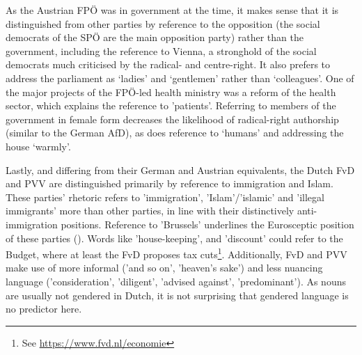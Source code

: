 \documentclass{article}
\begin{document}

As the Austrian FPÖ was in government at the time, it makes sense that it is distinguished from other parties by reference to the opposition (the social democrats of the SPÖ are the main opposition party) rather than the government, including the reference to Vienna, a stronghold of the social democrats much criticised by the radical- and centre-right. It also prefers to address the parliament as ‘ladies’ and ‘gentlemen’ rather than ‘colleagues’. One of the major projects of the FPÖ-led health ministry was a reform of the health sector, which explains the reference to 'patients'. Referring to members of the government in female form decreases the likelihood of radical-right authorship (similar to the German AfD), as does reference to ‘humans’ and addressing the house ‘warmly’.\par

Lastly, and differing from their German and Austrian equivalents, the Dutch FvD and PVV are distinguished primarily by reference to immigration and Islam. These parties' rhetoric refers to 'immigration', 'Islam'/'islamic' and 'illegal immigrants' more than other parties, in line with their distinctively anti-immigration positions. Reference to 'Brussels' underlines the Eurosceptic position of these parties (\cite{ThePopulist2019}). Words like 'house-keeping', and 'discount' could refer to the Budget, where at least the FvD proposes tax cuts\footnote{See \url{https://www.fvd.nl/economie}}. Additionally, FvD and PVV make use of more informal ('and so on', 'heaven’s sake') and less nuancing language ('consideration', 'diligent', 'advised against', 'predominant'). As nouns are usually not gendered in Dutch, it is not surprising that gendered language is no predictor here.\par
\end{document}
